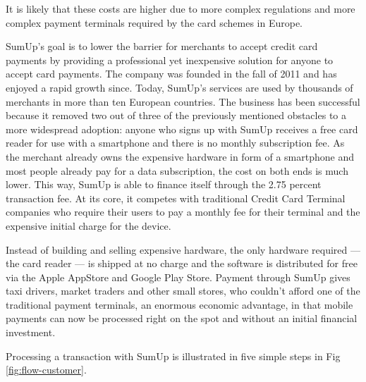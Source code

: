 \documentclass[a4paper, oneside]{csthesis}
\begin{document}
It is likely that these costs are higher due to more complex regulations and more complex payment terminals required by the card schemes in Europe.

SumUp's goal is to lower the barrier for merchants to accept credit card payments by providing a professional yet inexpensive solution for anyone to accept card payments. The company was founded in the fall of 2011 and has enjoyed a rapid growth since.
Today, SumUp's services are used by thousands of merchants in more than ten European countries.
The business has been successful because it removed two out of three of the previously mentioned obstacles to a more widespread adoption: anyone who signs up with SumUp receives a free card reader for use with a smartphone and there is no monthly subscription fee. As the merchant already owns the expensive hardware in form of a smartphone and most people already pay for a data subscription, the cost on both ends is much lower. This way, SumUp is able to finance itself through the 2.75 percent transaction fee. At its core, it competes with traditional Credit Card Terminal companies who require their users to pay a monthly fee for their terminal and the expensive initial charge for the device.

Instead of building and selling expensive hardware, the only hardware required --- the card reader --- is shipped at no charge and the software is distributed for free via the Apple AppStore and Google Play Store.
Payment through SumUp gives taxi drivers, market traders and other small stores, who couldn't afford one of the traditional payment terminals, an enormous economic advantage, in that mobile payments can now be processed right on the spot and without an initial financial investment.


Processing a transaction with SumUp is illustrated in five simple steps in Fig \ref{fig:flow-customer}.
\end{document}
